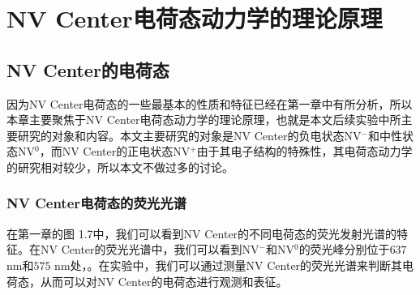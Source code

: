 \documentclass[type = bachelor]{whu-thesis}
\begin{document}

\chapter{NV Center电荷态动力学的理论原理}

\section{NV Center的电荷态}
因为NV Center电荷态的一些最基本的性质和特征已经在第一章中有所分析，所以本章主要聚焦于NV Center电荷态动力学的理论原理，也就是本文后续实验中所主要研究的对象和内容。本文主要研究的对象是NV Center的负电状态NV$^-$和中性状态NV$^0$，而NV Center的正电状态NV$^+$由于其电子结构的特殊性，其电荷态动力学的研究相对较少，所以本文不做过多的讨论\cite{Schreyvogel2016}。

\subsection{NV Center电荷态的荧光光谱}

在第一章的图 1.7中，我们可以看到NV Center的不同电荷态的荧光发射光谱的特征。在NV Center的荧光光谱中，我们可以看到NV$^-$和NV$^0$的荧光峰分别位于$637$ nm和$575$ nm处，。在实验中，我们可以通过测量NV Center的荧光光谱来判断其电荷态，从而可以对NV Center的电荷态进行观测和表征。
\end{document}
